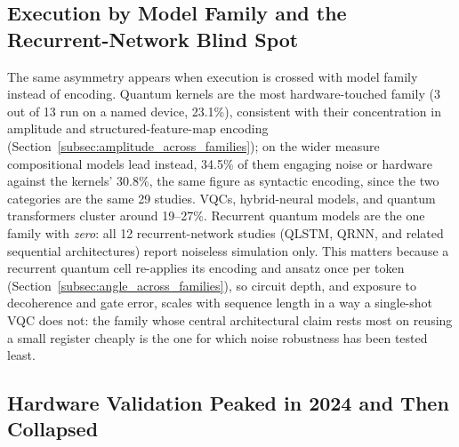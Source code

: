 \documentclass{ieeeaccess}
\begin{document}
\subsection{Execution by Model Family and the Recurrent-Network Blind Spot}
\label{subsec:execution_by_model_family}

The same asymmetry appears when execution is crossed with model family instead of encoding. Quantum kernels are the most hardware-touched family (3 out of 13 run on a named device, 23.1\%), consistent with their concentration in amplitude and structured-feature-map encoding (Section~\ref{subsec:amplitude_across_families}); on the wider measure compositional models lead instead, 34.5\% of them engaging noise or hardware against the kernels' 30.8\%, the same figure as syntactic encoding, since the two categories are the same 29 studies. VQCs, hybrid-neural models, and quantum transformers cluster around 19--27\%. Recurrent quantum models are the one family with \emph{zero}: all 12 recurrent-network studies (QLSTM, QRNN, and related sequential architectures) report noiseless simulation only. This matters because a recurrent quantum cell re-applies its encoding and ansatz once per token (Section~\ref{subsec:angle_across_families}), so circuit depth, and exposure to decoherence and gate error, scales with sequence length in a way a single-shot VQC does not: the family whose central architectural claim rests most on reusing a small register cheaply is the one for which noise robustness has been tested least.

\subsection{Hardware Validation Peaked in 2024 and Then Collapsed}
\label{subsec:hardware_timeline}
\end{document}
